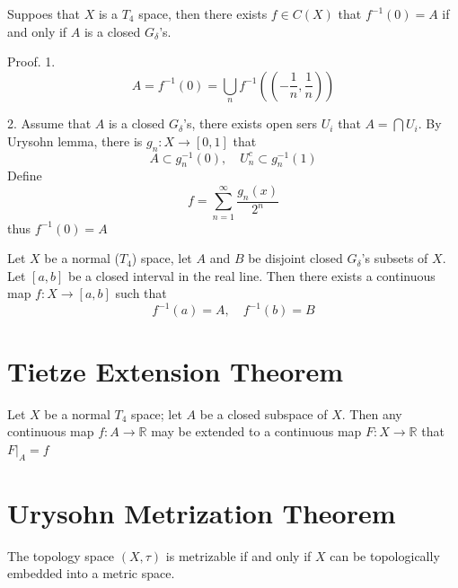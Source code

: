 \documentclass[12pt, a4paper, oneside]{book}
\begin{document}
\begin{corollary}
    Suppoes that $X$ is a $T_4$ space, then there exists $f\in C(X)$ that $f^{-1}(0)=A$ if and only if $A$ is a closed $G_\delta$'s.

    Proof.
    1.
    \begin{equation*}
        A =f^{-1}(0)
        =
        \bigcup_n f^{-1}\left((-\frac{1}{n},\frac{1}{n})\right)
    \end{equation*}

    2. Assume that $A$ is a closed $G_\delta$'s, there exists open sers $U_i$ that $A=\bigcap U_i$. By Urysohn lemma, there is $g_n : X \rightarrow \left[0,1\right]$ that
    \begin{equation*}
        A \subset g_n^{-1}(0), \quad U_n^c \subset g_n^{-1}(1)
    \end{equation*}
    Define
    \begin{equation*}
        f=\sum_{n=1}^\infty \frac{g_n(x)}{2^n}
    \end{equation*}
    thus $f^{-1}(0)=A$
\end{corollary}


\begin{theorem}
    Let $X$ be a normal ($T_4$) space, let $A$ and $B$ be disjoint closed $G_\delta$'s subsets of $X$. Let $[a, b]$ be a closed interval in the real line. Then there exists a continuous map $f: X \rightarrow[a, b]$ such that\begin{equation*}
        f^{-1}(a)=A, \quad f^{-1}(b)=B
    \end{equation*}
\end{theorem}

\section{Tietze Extension Theorem} %

\begin{theorem}
    Let $X$ be a normal $T_4$ space; let $A$ be a closed subspace of $X$.
    Then any continuous map $f:A \rightarrow \mathbb{R}$ may be extended to a continuous map $F : X\rightarrow \mathbb{R}$ that $\left.F\right|_A=f$
\end{theorem}

\section{Urysohn Metrization Theorem} %
\begin{proposition}
    The topology space $\left(X,\tau\right)$ is metrizable if and only if $X$ can be topologically embedded into a metric space.
\end{proposition}
\end{document}
